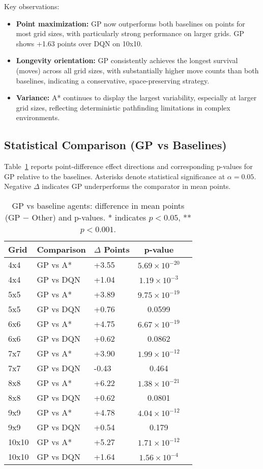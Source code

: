 \documentclass[a4paper,12pt]{article}
\begin{document}
Key observations:
\begin{itemize}
   \item \textbf{Point maximization:} GP now outperforms both baselines on points for most grid sizes, with particularly strong performance on larger grids. GP shows +1.63 points over DQN on 10x10.
   \item \textbf{Longevity orientation:} GP consistently achieves the longest survival (moves) across all grid sizes, with substantially higher move counts than both baselines, indicating a conservative, space-preserving strategy.
   \item \textbf{Variance:} A* continues to display the largest variability, especially at larger grid sizes, reflecting deterministic pathfinding limitations in complex environments.
\end{itemize}

\subsection{Statistical Comparison (GP vs Baselines)}
Table~\ref{tab:gp_comparisons_points} reports point-difference effect directions and corresponding p-values for GP relative to the baselines. Asterisks denote statistical significance at $\alpha = 0.05$. Negative $\Delta$ indicates GP underperforms the comparator in mean points.

\begin{table}[H]
   \centering
   \caption{GP vs baseline agents: difference in mean points (GP $-$ Other) and p-values. * indicates $p<0.05$, ** $p<0.001$.}
   \label{tab:gp_comparisons_points}
   \begin{tabular}{lllcc}
      \toprule
      Grid & Comparison & $\Delta$ Points & p-value \\
      \midrule
      4x4 & GP vs A*   & +3.55 & $5.69\times10^{-20}$ \\
      4x4 & GP vs DQN  & +1.04 & $1.19\times10^{-3}$ \\
      5x5 & GP vs A*   & +3.89 & $9.75\times10^{-19}$\\
      5x5 & GP vs DQN  & +0.76 & 0.0599 &  \\
      6x6 & GP vs A*   & +4.75 & $6.67\times10^{-19}$ \\
      6x6 & GP vs DQN  & +0.62 & 0.0862 &  \\
      7x7 & GP vs A*   & +3.90 & $1.99\times10^{-12}$ \\
      7x7 & GP vs DQN  & -0.43 & 0.464 &  \\
      8x8 & GP vs A*   & +6.22 & $1.38\times10^{-21}$ \\
      8x8 & GP vs DQN  & +0.62 & 0.0801 &  \\
      9x9 & GP vs A*   & +4.78 & $4.04\times10^{-12}$ \\
      9x9 & GP vs DQN  & +0.54 & 0.179 &  \\
      10x10 & GP vs A* & +5.27 & $1.71\times10^{-12}$ \\
      10x10 & GP vs DQN & +1.64 & $1.56\times10^{-4}$ \\
      \bottomrule
   \end{tabular}
\end{table}
\end{document}
